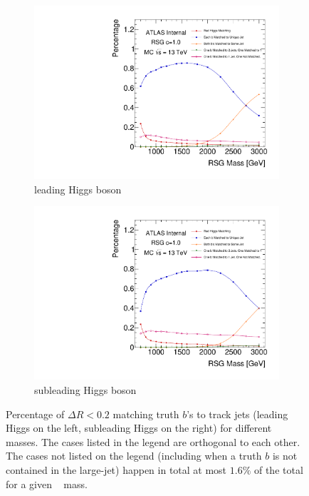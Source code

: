 \begin{figure}[htbp!]
    \captionsetup{justification=centering}
    \begin{subfigure}[b]{0.45\textwidth}
        \includegraphics[width=\textwidth,angle=-90]{figures/boosted/Truth/truth_b-matching.pdf}
        \caption{leading Higgs boson}
        \label{fig:truth-bmatch-lead}
    \end{subfigure}
    \quad
    \begin{subfigure}[b]{0.45\textwidth}
        \includegraphics[width=\textwidth,angle=-90]{figures/boosted/Truth/truth_b-matching-sublead.pdf}
        \caption{subleading Higgs boson}
        \label{fig:truth-bmatch-subl}
    \end{subfigure}
\caption{Percentage of $\Delta R<0.2$ matching truth $b$'s to track jets (leading Higgs on the left, subleading Higgs on the right) for different \Grav~ masses. The cases listed in the legend are orthogonal to each other. The cases not listed on the legend (including when a truth $b$ is not contained in the large-\R jet) happen in total at most $1.6\%$ of the total for a given \Grav~ mass.}
\label{fig:truth-bmatch}
\end{figure}



